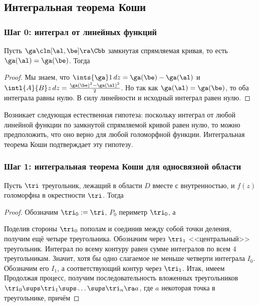 \documentclass[a4paper]{article}
\begin{document}
\begin{solution}
\subsection{Интегральная теорема Коши}

\subsubsection{Шаг 0: интеграл от линейных функций}

\begin{stm}
Пусть $\ga\cln[\al,\be]\ra\Cbb$ замкнутая спрямляемая кривая, то есть $\ga(\al)=\ga(\be)$. Тогда
\end{stm}
\begin{proof}
Мы знаем, что $\ints{\ga}1\,dz = \ga(\be)-\ga(\al)$ и $\intl{A}{B} z\,dz = \frac{\ga(\be)^2 - \ga(\al)^2}{2}$.
Но так как $\ga(\al) =\ga(\be)$, то оба интеграла равны нулю. В силу линейности и исходный интеграл равен нулю.
\end{proof}

Возникает следующая естественная гипотеза: поскольку интеграл от любой линейной функции по замкнутой спрямляемой кривой
равен нулю, то можно предположить, что оно верно для любой голоморфной функции.
Интегральная теорема Коши подтверждает эту гипотезу.

\subsubsection{Шаг 1: интегральная теорема Коши для односвязной области}

\begin{lemma}[Гурса]
Пусть $\tri$ треугольник, лежащий в области $D$ вместе с внутренностью, и $f(z)$ голоморфна в
окрестности $\tri$. Тогда
\end{lemma}
\begin{proof}
Обозначим $\tri_0 := \tri$, $P_0$ периметр $\tri_0$, а

\hangindent=-40mm
Поделив стороны $\tri_{0}$ пополам и соединив между собой точки деления, получим ещё четыре треугольника.
Обозначим через $\tri_1$ <<центральный>> треугольник. Интеграл по всему контуру равен сумме интегралов
по всем $4$ треугольникам. Значит, хотя бы одно слагаемое не меньше четверти интеграла $I_0$. Обозначим его $I_1$,
а соответствующий контур через $\tri_1$. Итак, имеем
Продолжая процесс, получим последовательность вложенных треугольников
$\tri_0 \sups \tri_1 \sups \ldots \sups \tri_n \ra a$, где $a$ некоторая точка в треугольнике, причём


\end{proof}
\end{solution}
\end{document}
